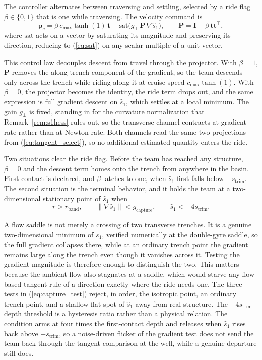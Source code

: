 \documentclass[lettersize,journal]{IEEEtran}
\begin{document}
The controller alternates between traversing and settling, selected by a
ride flag $\beta \in \{0,1\}$ that is one while traversing. The velocity
command is
\begin{equation}
    \dot{\mathbf{p}}_c =
    \beta\,c_{\max}\tanh(1)\,\mathbf{t}
    - \mathrm{sat}\!\bigl(g_\perp\,\mathbf{P}\,\nabla\hat{s}_1\bigr),
    \qquad
    \mathbf{P} = \mathbf{I} - \beta\,\mathbf{t}\mathbf{t}^\top,
    \label{eq:oecs_law}
\end{equation}
where $\mathrm{sat}$ acts on a vector by saturating its magnitude and
preserving its direction, reducing to (\ref{eq:sat}) on any scalar
multiple of a unit vector.

This control law decouples descent from travel through the projector.
With $\beta = 1$, $\mathbf{P}$ removes the along-trench component of the
gradient, so the team descends only across the trench while riding along
it at cruise speed $c_{\max}\tanh(1)$. With $\beta = 0$, the projector
becomes the identity, the ride term drops out, and the same expression
is full gradient descent on $\hat{s}_1$, which settles at a local
minimum. The gain $g_\perp$ is fixed, standing in for the curvature
normalization that Remark~\ref{rem:s1hess} rules out, so the transverse
channel contracts at gradient rate rather than at Newton rate.
Both channels read the same two projections from
(\ref{eq:tangent_select}), so no additional estimated quantity enters the
ride.

Two situations clear the ride flag. Before the team has reached any
structure, $\beta = 0$ and the descent term homes onto the trench from
anywhere in the basin. First contact is declared, and $\beta$ latches to
one, when $\hat{s}_1$ first falls below $-s_{\mathrm{trim}}$. The second
situation is the terminal behavior, and it holds the team at a
two-dimensional stationary point of $\hat{s}_1$ when
\begin{equation}
    r > r_{\mathrm{band}}, \qquad
    \lVert\nabla\hat{s}_1\rVert < g_{\mathrm{capture}}, \qquad
    \hat{s}_1 < -4 s_{\mathrm{trim}}.
    \label{eq:capture_test}
\end{equation}

A flow saddle is not merely a crossing of two transverse trenches. It is
a genuine two-dimensional minimum of $s_1$, verified numerically at the
double-gyre saddle, so the full gradient collapses there, while at an
ordinary trench point the gradient remains large along the trench even
though it vanishes across it. Testing the gradient magnitude is
therefore enough to distinguish the two. This matters because the
ambient flow also stagnates at a saddle, which would starve any
flow-based tangent rule of a direction exactly where the ride needs one.
The three tests in (\ref{eq:capture_test}) reject, in order, the
isotropic point, an ordinary trench point, and a shallow flat spot of
$\hat{s}_1$ away from real structure. The $-4s_{\mathrm{trim}}$ depth
threshold is a hysteresis ratio rather than a physical relation. The
condition arms at four times the first-contact depth and releases when
$\hat{s}_1$ rises back above $-s_{\mathrm{trim}}$, so a noise-driven
flicker of the gradient test does not send the team back through the
tangent comparison at the well, while a genuine departure still does.
\end{document}
